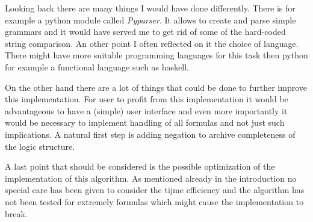 Looking back there are many things I would have done differently. There is for example a python module called \emph{Pyparser}. It allows to create and parse simple grammars and it would have served me to get rid of some of the hard-coded string comparison. An other point I often reflected on it the choice of language. There might have more suitable programming languages for this task then python for example a functional language such as haskell. 

On the other hand there are a lot of things that could be done to further improve this implementation. For user to profit from this implementation it would be advantageous to have a (simple) user interface and even more importantly it would be necessary to implement handling of all formulas and not just such implications. A natural first step is adding negation to archive completeness of the logic structure.

A last point that should be considered is the possible optimization of the implementation of this algorithm. As mentioned already in the introduction no special care has been given to consider the tijme efficiency and the algorithm has not been tested for extremely formulas which might cause the implementation to break. 